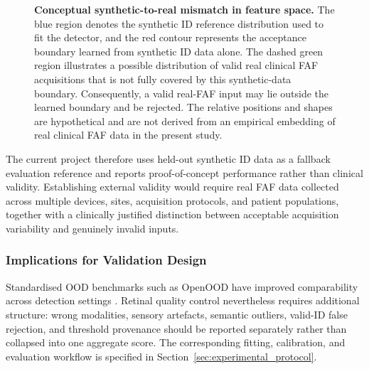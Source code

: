 \documentclass[fleqn,12pt]{olplainarticle}
\begin{document}
\begin{figure}[htbp]

\caption[Conceptual synthetic-to-real support mismatch.]{\textbf{Conceptual
synthetic-to-real mismatch in feature space.}
The blue region denotes the synthetic ID reference distribution used to fit the detector, and the red contour represents the acceptance boundary learned from synthetic ID data alone. The dashed green region illustrates a possible distribution of valid real clinical FAF acquisitions that is not fully covered by this synthetic-data boundary. Consequently, a valid real-FAF input may lie outside the learned boundary and be rejected. The relative positions and shapes are hypothetical and are not derived from an empirical embedding of real clinical FAF data in the present study.}
\label{fig:sim_to_real}
\end{figure}

The current project therefore uses held-out synthetic ID data as a fallback evaluation reference and reports proof-of-concept performance rather than clinical validity. Establishing external validity would require real FAF data collected across multiple devices, sites, acquisition protocols, and patient populations, together with a clinically justified distinction between acceptable acquisition variability and genuinely invalid inputs.

\subsubsection{Implications for Validation Design}

Standardised OOD benchmarks such as OpenOOD have improved comparability across detection settings \cite{yang2022openood,zhang2023openood}. Retinal quality control nevertheless requires additional structure: wrong modalities, sensory artefacts, semantic outliers, valid-ID false rejection, and threshold provenance should be reported separately rather than collapsed into one aggregate score. The corresponding fitting, calibration, and evaluation workflow is specified in Section~\ref{sec:experimental_protocol}.
\end{document}
